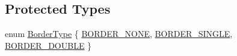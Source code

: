 \subsection*{Protected Types}
\begin{DoxyCompactItemize}
\item 
enum \hyperlink{classmts_component_viewer_a2bd239a01fe3124526c4322e7305b99f}{Border\-Type} \{ \hyperlink{classmts_component_viewer_a2bd239a01fe3124526c4322e7305b99fa052b7b827ea4321a586d118000c4a552}{B\-O\-R\-D\-E\-R\-\_\-\-N\-O\-N\-E}, 
\hyperlink{classmts_component_viewer_a2bd239a01fe3124526c4322e7305b99faf0a34a78342afbf7f576922058838128}{B\-O\-R\-D\-E\-R\-\_\-\-S\-I\-N\-G\-L\-E}, 
\hyperlink{classmts_component_viewer_a2bd239a01fe3124526c4322e7305b99fab167f9fc9c912e6defea2768f25305b9}{B\-O\-R\-D\-E\-R\-\_\-\-D\-O\-U\-B\-L\-E}
 \}
\end{DoxyCompactItemize}

